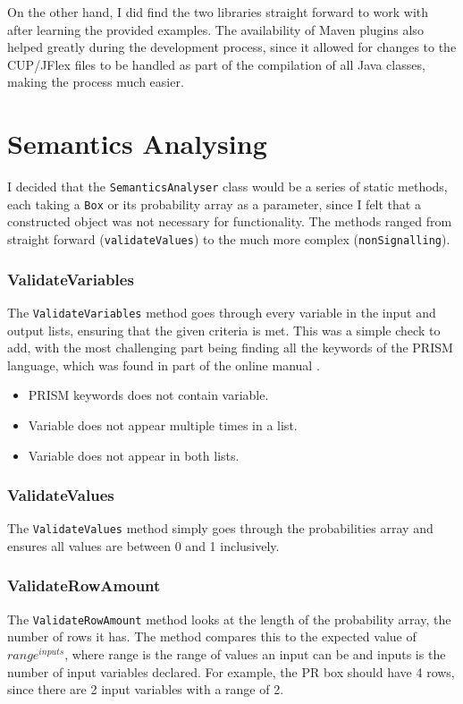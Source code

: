 \documentclass[report.tex]{subfiles}
\begin{document}
On the other hand, I did find the two libraries straight forward to work with
after learning the provided examples. The availability of Maven plugins also
helped greatly during the development process, since it allowed for changes to
the CUP/JFlex files to be handled as part of the compilation of all Java
classes, making the process much easier.

\section{Semantics Analysing} %
\label{sec:semantics_analysing}
I decided that the \texttt{SemanticsAnalyser} class would be a series of static
methods, each taking a \texttt{Box} or its probability array as a parameter,
since I felt that a constructed object was not necessary for functionality. The
methods ranged from straight forward (\texttt{validateValues}) to the much more
complex (\texttt{nonSignalling}).

\subsubsection{ValidateVariables} %
\label{ssub:validateVariables}
The \texttt{ValidateVariables} method goes through every variable in the input
and output lists, ensuring that the given criteria is met. This was a simple
check to add, with the most challenging part being finding all the keywords of
the PRISM language, which was found in part of the online manual
\cite{prism_keywords}.
\begin{itemize}
    \item PRISM keywords does not contain variable.
    \item Variable does not appear multiple times in a list.
    \item Variable does not appear in both lists.
\end{itemize}

\subsubsection{ValidateValues} %
\label{ssub:validatevalues}
The \texttt{ValidateValues} method simply goes through the probabilities array
and ensures all values are between 0 and 1 inclusively.

\subsubsection{ValidateRowAmount} %
\label{ssub:validaterowamount}
The \texttt{ValidateRowAmount} method looks at the length of the probability
array, the number of rows it has. The method compares this to the expected
value of \(range ^{inputs}\), where range is the range of values an input can be
and inputs is the number of input variables declared. For example, the PR box
should have 4 rows, since there are 2 input variables with a range of 2.
\end{document}
